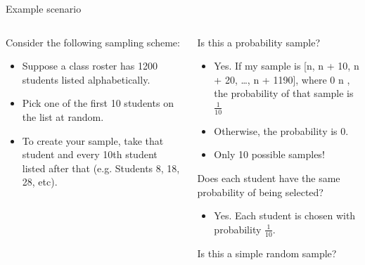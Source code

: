 \documentclass[aspectratio=169]{../latex_main/tntbeamer}  %
\begin{document}
	\begin{frame}{Example scenario}
	    \begin{columns}
	        \begin{column}{.3\textwidth}
	            Consider the following sampling scheme:

	            \begin{itemize}
	                \item Suppose a class roster has 1200 students listed alphabetically.
	                \item Pick one of the first 10 students on the list at random.
	                \item To create your sample, take that student and every 10th student listed after that (e.g. Students 8, 18, 28, etc).
	            \end{itemize}

                 
	        \end{column}
	        
	        \begin{column}{.6\textwidth}
	           Is this a probability sample?
	           \begin{itemize}
	               \item Yes. If my sample is [n, n + 10, n + 20, …, n + 1190], where 0 \leq n , the probability of that sample is $\frac{1}{10}$
	               \item Otherwise, the probability is 0.
	               \item Only 10 possible samples!
	           \end{itemize}
	           Does each student have the same probability of being selected?
	           \begin{itemize}
	               \item Yes. Each student is chosen with probability $\frac{1}{10}$. 
	           \end{itemize}
	           Is this a simple random sample?


	        \end{column}
	        
	    \end{columns}
	    
	\end{frame}
	
\end{document}
